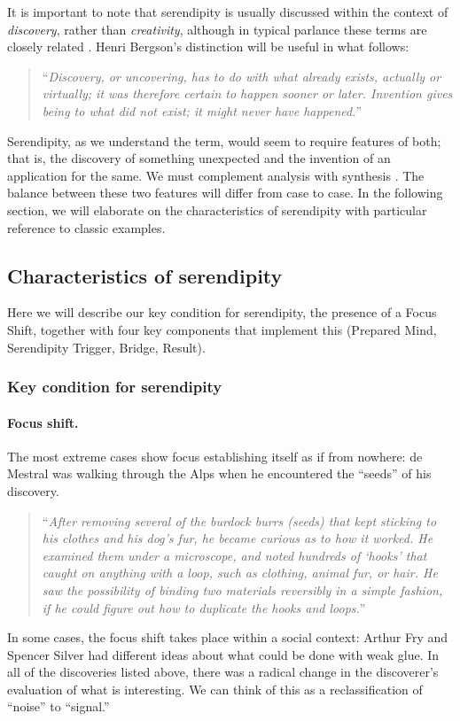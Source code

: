 It is important to note that serendipity is usually discussed within
the context of \emph{discovery}, rather than \emph{creativity},
although in typical parlance these terms are closely related
\cite{jordanous12jims}.  Henri Bergson's distinction will be useful in
what follows:
\begin{quote}
``\emph{Discovery, or uncovering, has to do with what already exists,
    actually or virtually; it was therefore certain to happen sooner
    or later.  Invention gives being to what did not exist; it might
    never have happened.}''~\cite{bergson2010creative}
\end{quote}
Serendipity, as we understand the term, would seem to require features
of both; that is, the discovery of something unexpected and the
invention of an application for the same.  We must complement analysis
with synthesis \cite{delanda1993virtual}.  The balance between these
two features will differ from case to case.  In the following section,
we will elaborate on the characteristics of serendipity with
particular reference to classic examples.

\subsection{Characteristics of serendipity}\label{sec:characteristics}

Here we will describe our key condition for serendipity, the presence
of a Focus Shift, together with four key components that implement
this (Prepared Mind, Serendipity Trigger, Bridge, Result).

\subsubsection*{Key condition for serendipity}

\paragraph{Focus shift.}
The most extreme cases show focus establishing itself as if from
nowhere: de Mestral was walking through the Alps when he encountered
the ``seeds'' of his discovery.
\begin{quote}
``\emph{After removing several of the burdock burrs (seeds) that kept sticking to his clothes and his dog's fur, he became curious as to how it worked. He examined them under a microscope, and noted hundreds of `hooks' that caught on anything with a loop, such as clothing, animal fur, or hair. He saw the possibility of binding two materials reversibly in a simple fashion, if he could figure out how to duplicate the hooks and loops.}''~\cite{wiki:velcro}
\end{quote}
In some cases, the focus shift takes place within a social context:
Arthur Fry and Spencer Silver had different ideas about what could be
done with weak glue.
%
In all of the discoveries listed above, there was a radical change in
the discoverer's evaluation of what is interesting.  We can think of
this as a reclassification of ``noise'' to ``signal.''

